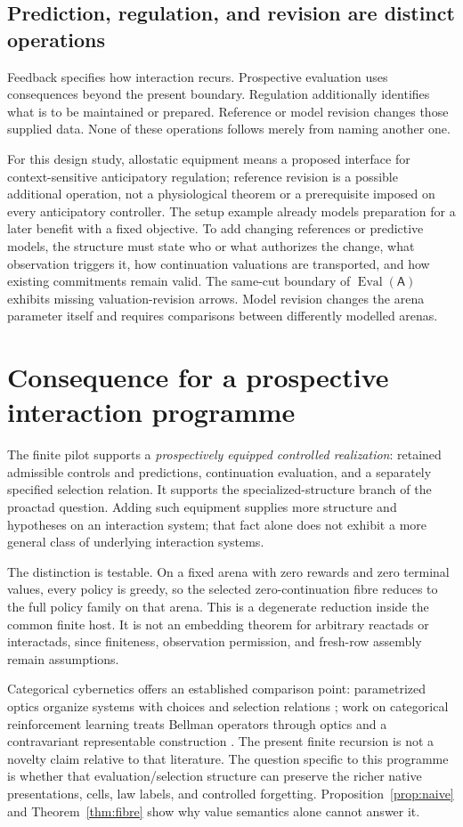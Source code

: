 \documentclass[11pt]{article}
\theoremstyle{definition}
\newcommand{\A}{\mathsf A}
\newcommand{\Eval}{\operatorname{Eval}}
\begin{document}
\subsection{Prediction, regulation, and revision are distinct operations}
Feedback specifies how interaction recurs. Prospective evaluation uses
consequences beyond the present boundary. Regulation additionally identifies
what is to be maintained or prepared. Reference or model revision changes
those supplied data. None of these operations follows merely from naming
another one.

For this design study, allostatic equipment means a proposed interface for
context-sensitive anticipatory regulation; reference revision is a possible
additional operation, not a physiological theorem or a prerequisite imposed
on every anticipatory controller. The setup example already models
preparation for a later benefit with a fixed objective. To add changing
references or predictive models, the structure must state who or what
authorizes the change, what observation triggers it, how continuation
valuations are transported, and how existing commitments remain valid.
The same-cut boundary of \(\Eval(\A)\) exhibits missing valuation-revision
arrows. Model revision changes the arena parameter itself and requires
comparisons between differently modelled arenas.

\section{Consequence for a prospective interaction programme}
\label{sec:consequence}
The finite pilot supports a \emph{prospectively equipped controlled
realization}: retained admissible controls and predictions, continuation
evaluation, and a separately specified selection relation. It supports
the specialized-structure branch of the proactad question. Adding such
equipment supplies more structure and hypotheses on an interaction system;
that fact alone does not exhibit a more general class of underlying
interaction systems.

The distinction is testable. On a fixed arena with zero rewards and zero
terminal values, every policy is greedy, so the selected zero-continuation
fibre reduces to the full policy family on that arena. This is a degenerate reduction
inside the common finite host. It is not an embedding theorem for arbitrary
reactads or interactads, since finiteness, observation permission, and
fresh-row assembly remain assumptions.

Categorical cybernetics offers an established comparison point:
parametrized optics organize systems with choices and selection relations
\cite{cybernetics}; work on categorical reinforcement learning treats
Bellman operators through optics and a contravariant representable
construction \cite{rl}. The present finite recursion is not a novelty
claim relative to that literature. The question specific to this programme
is whether that evaluation/selection structure can preserve the richer
native presentations, cells, law labels, and controlled forgetting.
Proposition~\ref{prop:naive} and Theorem~\ref{thm:fibre} show why value
semantics alone cannot answer it.
\end{document}
